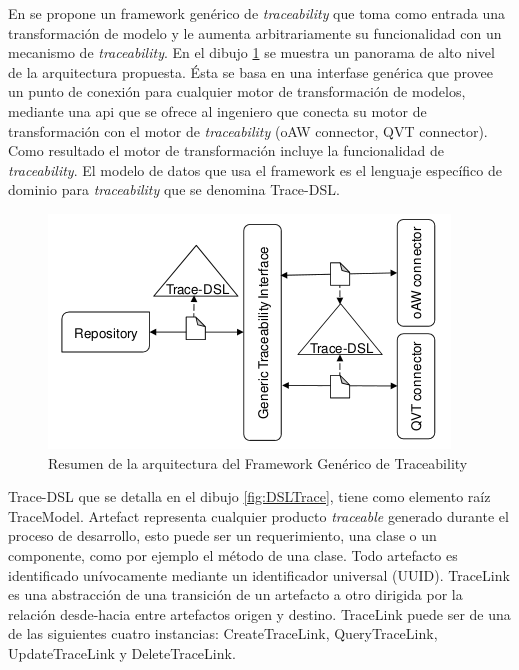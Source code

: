 \documentclass[a4paper,12pt,oneside,spanish]{book}
\begin{document}
En \cite{GrammelKastenholz} se propone un framework genérico de \textit{traceability} que toma como entrada una transformación de modelo y le aumenta arbitrariamente su funcionalidad con un mecanismo de \textit{traceability}. En el dibujo \ref{fig:GenericoArquitectura} se muestra un panorama de alto nivel de la arquitectura propuesta. Ésta se basa en una interfase genérica que provee un punto de conexión para cualquier motor de transformación de modelos, mediante una \gls{api} que se ofrece al ingeniero que conecta su motor de transformación con el motor de \textit{traceability} (\textsf{oAW connector}, \textsf{QVT connector}). Como resultado el motor de transformación incluye la funcionalidad de \textit{traceability}. El modelo de datos que usa el framework es el lenguaje específico de dominio para \textit{traceability} que se denomina \textsf{Trace-DSL}.

\begin{figure}[hbtp]
\centering
\includegraphics[scale=.7]{./img/GenericTraceFrame_Arquitectura}
\caption{Resumen de la arquitectura del Framework Genérico de Traceability}
\label{fig:GenericoArquitectura}
\end{figure}


\textsf{Trace-DSL} que se detalla en el dibujo \ref{fig:DSLTrace}, tiene como elemento raíz \textsf{TraceModel}. \textsf{Artefact} representa cualquier producto \textit{traceable} generado durante el proceso de desarrollo, esto puede ser un requerimiento, una clase o un componente, como por ejemplo el método de una clase. Todo artefacto es identificado unívocamente mediante un identificador universal (\textsf{UUID}). \textsf{TraceLink} es una abstracción de una transición de un artefacto a otro dirigida por la relación desde-hacia entre artefactos origen y destino. \textsf{TraceLink} puede ser de una de las siguientes cuatro instancias: \textsf{CreateTraceLink}, \textsf{QueryTraceLink}, \textsf{UpdateTraceLink} y \textsf{DeleteTraceLink}.
\end{document}
